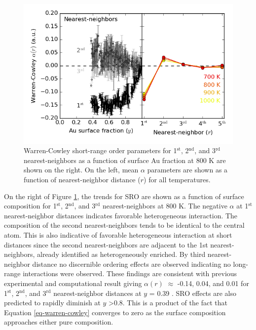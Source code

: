 \documentclass[12pt]{cmuthesis}
\begin{document}
\begin{figure}[h]
\centering
\includegraphics[width=5in]{./images/warren-cowley.png}
\caption{\label{fig-warren-cowley}
Warren-Cowley short-range order parameters for 1\(^{\text{st}}\), 2\(^{\text{nd}}\), and 3\(^{\text{rd}}\) nearest-neighbors as a function of surface Au fraction at 800 K are shown on the right. On the left, mean \(\alpha\) parameters are shown as a function of nearest-neighbor distance (\(r\)) for all temperatures.}
\end{figure}

On the right of Figure \ref{fig-warren-cowley}, the trends for SRO are shown as a function of surface composition for 1\(^{\text{st}}\), 2\(^{\text{nd}}\), and 3\(^{\text{rd}}\) nearest-neighbors at 800 K. The negative \(\alpha\) at 1\(^{\text{st}}\) nearest-neighbor distances indicates favorable heterogeneous interaction. The composition of the second nearest-neighbors tends to be identical to the central atom. This is also indicative of favorable heterogeneous interaction at short distances since the second nearest-neighbors are adjacent to the 1st nearest-neighbors, already identified as heterogeneously enriched. By third nearest-neighbor distance no discernible ordering effects are observed indicating no long-range interactions were observed. These findings are consistent with previous experimental and computational result giving \(\alpha(r)\) \(\approx\) -0.14, 0.04, and 0.01 for 1\(^{\text{st}}\), 2\(^{\text{nd}}\), and 3\(^{\text{rd}}\) nearest-neighbor distances at \(y\) = 0.39  \cite{sadigh-1999-short-range}. SRO effects are also predicted to rapidly diminish at \(y\) \textgreater 0.8. This is a product of the fact that Equation \ref{eq-warren-cowley} converges to zero as the surface composition approaches either pure composition.
\end{document}
